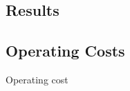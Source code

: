 \documentclass[review,12pt,authoryear]{elsarticle}
\begin{document}
\begin{linenumbers}
\section{Results}




\subsection{Operating Costs}


Operating cost 


\end{linenumbers}
\end{document}
